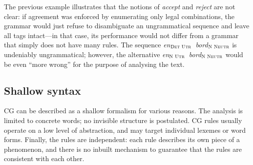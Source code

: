 
The previous example illustrates that the notions of \emph{accept} and \emph{reject} are not clear: if agreement was enforced
by enumerating only legal combinations, the grammar would just refuse to disambiguate
an ungrammatical sequence and leave all tags intact---in that case,
its performance would not differ from a grammar that simply does not have many rules.
The sequence \emph{en}$_{\textsc{Det Utr}}$~\emph{bord}$_{\textsc{N Neutr}}$ is undeniably ungrammatical; however, the alternative \emph{en}$_{\textsc{N Utr}}$~\emph{bord}$_{\textsc{N Neutr}}$  would be even ``more wrong'' for the purpose of analysing the text.




\subsection{Shallow syntax}\label{shallow-syntax}

CG can be described as a shallow formalism for various reasons. 
The analysis is limited to concrete words; no invisible structure is postulated.
CG rules usually operate on a low level of abstraction, and may target individual lexemes or word forms.
Finally, the rules are independent: each rule describes its own piece of a phenomenon, and there is no inbuilt mechanism to guarantee that the rules are consistent with each other.



